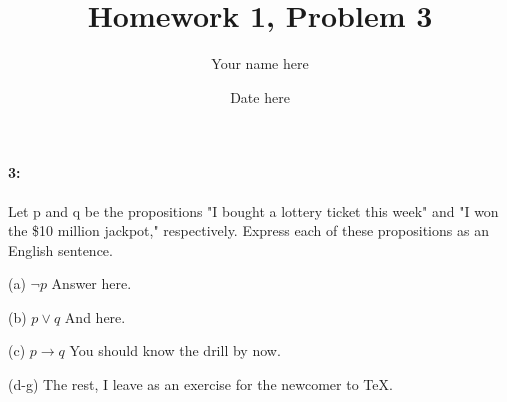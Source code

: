 \documentclass{article}
\title{Homework 1, Problem 3}
\author{Your name here}
\date{Date here}
\begin{document}
	\maketitle
	
	\paragraph{3:}
	Let p and q be the propositions "I bought a lottery ticket this week" and "I won the \$10 million jackpot," respectively. Express each of these propositions as an English sentence.
	
	(a) $\lnot p$
	\newline \indent \indent Answer here.
	\newline
	
	(b) $p \lor q$
	\newline \indent \indent And here.
	\newline
	
	(c) $p \rightarrow q$
	\newline \indent \indent You should know the drill by now.
	\newline
	
	(d-g) The rest, I leave as an exercise for the newcomer to \TeX.
	
\end{document}
